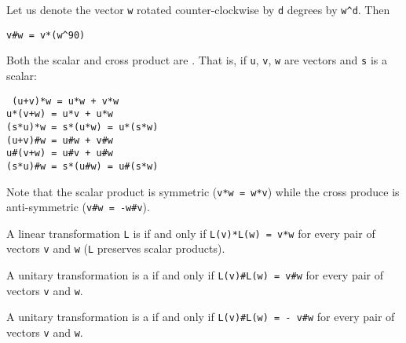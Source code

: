 \documentclass[12pt]{article}
\begin{document}
Let us denote the vector {\tt w} rotated counter-clockwise by
{\tt d} degrees by {\tt w\textasciicircum d}.  Then \\
\centerline{\tt v\#w = v*(w\textasciicircum 90)}

\begin{lemma}
Both the scalar and cross product are .  That is,
if {\tt u}, {\tt v}, {\tt w} are vectors and {\tt s} is a scalar:
\begin{center}
\tt
(u+v)*w = u*w + v*w \\
u*(v+w) = u*v + u*w \\
(s*u)*w = s*(u*w) = u*(s*w) \\
(u+v)\#w = u\#w + v\#w \\
u\#(v+w) = u\#v + u\#w \\
(s*u)\#w = s*(u\#w) = u\#(s*w)
\end{center}

\end{lemma}

Note that the scalar product is symmetric ({\tt v*w = w*v})
while the cross produce is anti-symmetric ({\tt v\#w = -w\#v}).

\begin{definition}
A linear transformation {\tt L} is  if and only if
{\tt L(v)*L(w) = v*w} for every pair of vectors {\tt v} and {\tt w}
({\tt L} preserves scalar products).

A unitary transformation is a  if and only if
{\tt L(v)\#L(w) = v\#w} for every pair of vectors {\tt v} and {\tt w}.

A unitary transformation is a  if and only if
{\tt L(v)\#L(w) = - v\#w} for every pair of vectors {\tt v} and {\tt w}.

\end{definition}
\end{document}
